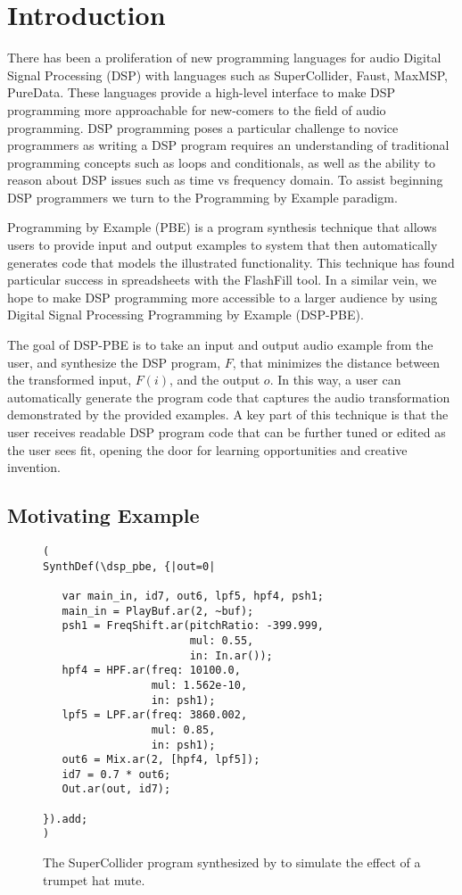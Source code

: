 
\section{Introduction}

There has been a proliferation of new programming languages for audio Digital Signal Processing (DSP) with languages such as SuperCollider, Faust, MaxMSP, PureData.
These languages provide a high-level interface to make DSP programming more approachable for new-comers to the field of audio programming.
DSP programming poses a particular challenge to novice programmers as writing a DSP program requires an understanding of traditional programming concepts such as loops and conditionals, as well as the ability to reason about DSP issues such as time vs frequency domain.
To assist beginning DSP programmers we turn to the Programming by Example paradigm.

Programming by Example (PBE) is a program synthesis technique that allows users to provide input and output examples to system that then automatically generates code that models the illustrated functionality.
This technique has found particular success in spreadsheets with the FlashFill tool.
In a similar vein, we hope to make DSP programming more accessible to a larger audience by using Digital Signal Processing Programming by Example (DSP-PBE).

The goal of DSP-PBE is to take an input and output audio example from the user, and synthesize the DSP program, $F$, that minimizes the distance between the transformed input, $F(i)$, and the output $o$.
In this way, a user can automatically generate the program code that captures the audio transformation demonstrated by the provided examples.
A key part of this technique is that the user receives readable DSP program code that can be further tuned or edited as the user sees fit, opening the door for learning opportunities and creative invention.


\subsection{Motivating Example}


\begin{figure}
\begin{lstlisting}
( 
SynthDef(\dsp_pbe, {|out=0|

   var main_in, id7, out6, lpf5, hpf4, psh1;
   main_in = PlayBuf.ar(2, ~buf);
   psh1 = FreqShift.ar(pitchRatio: -399.999, 
                       mul: 0.55, 
                       in: In.ar());
   hpf4 = HPF.ar(freq: 10100.0, 
                 mul: 1.562e-10, 
                 in: psh1);
   lpf5 = LPF.ar(freq: 3860.002, 
                 mul: 0.85, 
                 in: psh1);
   out6 = Mix.ar(2, [hpf4, lpf5]);
   id7 = 0.7 * out6;
   Out.ar(out, id7);

}).add;
)
\end{lstlisting}
\caption{The SuperCollider program synthesized by \ourTool to simulate the effect of a trumpet hat mute.}
\label{fig:sc_code}
\end{figure}

